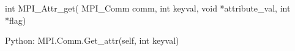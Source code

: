 int MPI_Attr_get(
    MPI_Comm comm, int keyval, void *attribute_val, int *flag)

Python:
MPI.Comm.Get_attr(self, int keyval)
